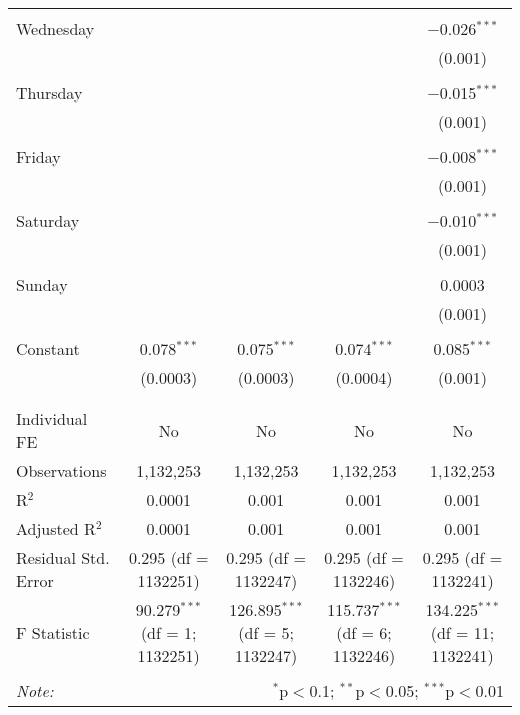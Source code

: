 \documentclass[
]{article}
\begin{document}
\begin{table}[!htbp]
{\begin{tabular}{@{\extracolsep{5pt}}lcccc}
  & & & & \\ 
 Wednesday &  &  &  & $-$0.026$^{***}$ \\ 
  &  &  &  & (0.001) \\ 
  & & & & \\ 
 Thursday &  &  &  & $-$0.015$^{***}$ \\ 
  &  &  &  & (0.001) \\ 
  & & & & \\ 
 Friday &  &  &  & $-$0.008$^{***}$ \\ 
  &  &  &  & (0.001) \\ 
  & & & & \\ 
 Saturday &  &  &  & $-$0.010$^{***}$ \\ 
  &  &  &  & (0.001) \\ 
  & & & & \\ 
 Sunday &  &  &  & 0.0003 \\ 
  &  &  &  & (0.001) \\ 
  & & & & \\ 
 Constant & 0.078$^{***}$ & 0.075$^{***}$ & 0.074$^{***}$ & 0.085$^{***}$ \\ 
  & (0.0003) & (0.0003) & (0.0004) & (0.001) \\ 
  & & & & \\ 
\hline \\[-1.8ex] 
Individual FE & No & No & No & No \\ 
Observations & 1,132,253 & 1,132,253 & 1,132,253 & 1,132,253 \\ 
R$^{2}$ & 0.0001 & 0.001 & 0.001 & 0.001 \\ 
Adjusted R$^{2}$ & 0.0001 & 0.001 & 0.001 & 0.001 \\ 
Residual Std. Error & 0.295 (df = 1132251) & 0.295 (df = 1132247) & 0.295 (df = 1132246) & 0.295 (df = 1132241) \\ 
F Statistic & 90.279$^{***}$ (df = 1; 1132251) & 126.895$^{***}$ (df = 5; 1132247) & 115.737$^{***}$ (df = 6; 1132246) & 134.225$^{***}$ (df = 11; 1132241) \\ 
\hline 
\hline \\[-1.8ex] 
\textit{Note:}  & \multicolumn{4}{r}{$^{*}$p$<$0.1; $^{**}$p$<$0.05; $^{***}$p$<$0.01} \\ 
\end{tabular}
} 
\end{table} 
\newpage
\end{document}
